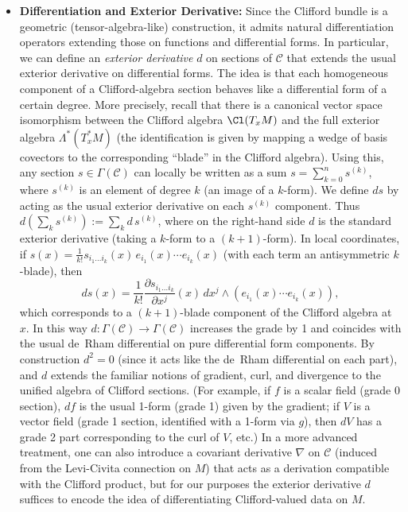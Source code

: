 \documentclass[12pt]{article}
\begin{document}
\begin{itemize}
    \item \textbf{Differentiation and Exterior Derivative:} Since the Clifford bundle is a geometric (tensor-algebra-like) construction, it admits natural differentiation operators extending those on functions and differential forms. In particular, we can define an \emph{exterior derivative} $d$ on sections of $\mathcal{C}$ that extends the usual exterior derivative on differential forms. The idea is that each homogeneous component of a Clifford-algebra section behaves like a differential form of a certain degree. More precisely, recall that there is a canonical vector space isomorphism between the Clifford algebra $\Cl(T_xM)$ and the full exterior algebra $\Lambda^*(T_x^*M)$ (the identification is given by mapping a wedge of basis covectors to the corresponding “blade” in the Clifford algebra). Using this, any section $s \in \Gamma(\mathcal{C})$ can locally be written as a sum $s = \sum_{k=0}^n s^{(k)}$, where $s^{(k)}$ is an element of degree $k$ (an image of a $k$-form). We define $d s$ by acting as the usual exterior derivative on each $s^{(k)}$ component.  Thus $d(\sum_k s^{(k)}) := \sum_k d\,s^{(k)}$, where on the right-hand side $d$ is the standard exterior derivative (taking a $k$-form to a $(k+1)$-form). In local coordinates, if $s(x) = \frac{1}{k!} s_{i_1\ldots i_k}(x)\,e_{i_1}(x)\cdots e_{i_k}(x)$ (with each term an antisymmetric $k$-blade), then 
    \[
       d s(x) = \frac{1}{k!} \frac{\partial s_{i_1\ldots i_k}}{\partial x^j}(x)\,dx^j \wedge (e_{i_1}(x)\cdots e_{i_k}(x)) ,
    \] 
    which corresponds to a $(k+1)$-blade component of the Clifford algebra at $x$. In this way $d: \Gamma(\mathcal{C}) \to \Gamma(\mathcal{C})$ increases the grade by 1 and coincides with the usual de~Rham differential on pure differential form components. By construction $d^2=0$ (since it acts like the de~Rham differential on each part), and $d$ extends the familiar notions of gradient, curl, and divergence to the unified algebra of Clifford sections. (For example, if $f$ is a scalar field (grade 0 section), $df$ is the usual 1-form (grade 1) given by the gradient; if $V$ is a vector field (grade 1 section, identified with a 1-form via $g$), then $dV$ has a grade 2 part corresponding to the curl of $V$, etc.) In a more advanced treatment, one can also introduce a covariant derivative $\nabla$ on $\mathcal{C}$ (induced from the Levi-Civita connection on $M$) that acts as a derivation compatible with the Clifford product, but for our purposes the exterior derivative $d$ suffices to encode the idea of differentiating Clifford-valued data on $M$. 


\end{itemize}
\end{document}
